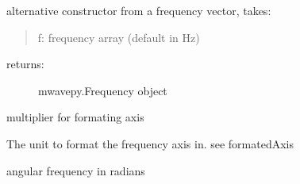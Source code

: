 \documentclass[letterpaper,10pt,english]{sphinxmanual}
\begin{document}
\begin{fulllineitems}
\begin{fulllineitems}
\end{fulllineitems}


\begin{fulllineitems}
\label{api/mwavepy:mwavepy.frequency.Frequency.from_f}
alternative constructor from a frequency vector,
takes:
\begin{quote}

f: frequency array (default in Hz)
\end{quote}
\begin{description}
\item[{returns:}] \leavevmode
mwavepy.Frequency object

\end{description}

\end{fulllineitems}


\begin{fulllineitems}
\label{api/mwavepy:mwavepy.frequency.Frequency.labelXAxis}
\end{fulllineitems}


\begin{fulllineitems}
\label{api/mwavepy:mwavepy.frequency.Frequency.multiplier}
multiplier for formating axis

\end{fulllineitems}


\begin{fulllineitems}
\label{api/mwavepy:mwavepy.frequency.Frequency.unit}
The unit to format the frequency axis in. see formatedAxis

\end{fulllineitems}


\begin{fulllineitems}
\label{api/mwavepy:mwavepy.frequency.Frequency.w}
angular frequency in radians

\end{fulllineitems}


\end{fulllineitems}
\end{document}
